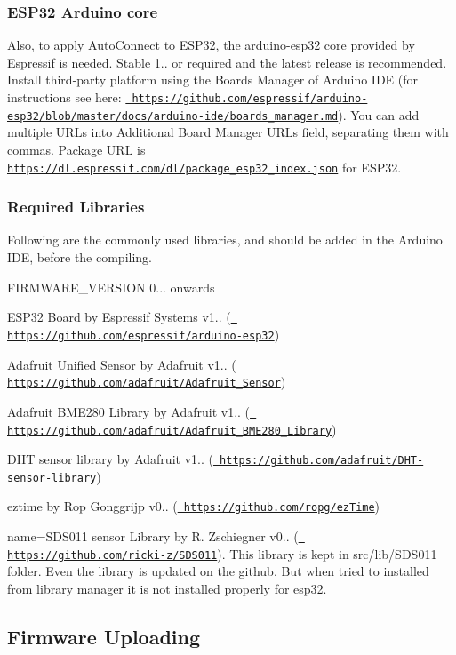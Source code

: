 \hypertarget{index_boardlib}{}\subsubsection{E\+S\+P32 Arduino core}\label{index_boardlib}
Also, to apply Auto\+Connect to E\+S\+P32, the arduino-\/esp32 core provided by Espressif is needed. Stable 1.. or required and the latest release is recommended. Install third-\/party platform using the Boards Manager of Arduino I\+DE (for instructions see here\+: \href{https://github.com/espressif/arduino-esp32/blob/master/docs/arduino-ide/boards_manager.md}{\texttt{ https\+://github.\+com/espressif/arduino-\/esp32/blob/master/docs/arduino-\/ide/boards\+\_\+manager.\+md}}). You can add multiple U\+R\+Ls into Additional Board Manager U\+R\+Ls field, separating them with commas. Package U\+RL is \href{https://dl.espressif.com/dl/package_esp32_index.json}{\texttt{ https\+://dl.\+espressif.\+com/dl/package\+\_\+esp32\+\_\+index.\+json}} for E\+S\+P32.\hypertarget{index_lib}{}\subsubsection{Required Libraries}\label{index_lib}
Following are the commonly used libraries, and should be added in the Arduino I\+DE, before the compiling.
\begin{DoxyEnumerate}
\item F\+I\+R\+M\+W\+A\+R\+E\+\_\+\+V\+E\+R\+S\+I\+ON 0... onwards
\begin{DoxyItemize}
\item E\+S\+P32 Board by Espressif Systems v1.. (\href{https://github.com/espressif/arduino-esp32}{\texttt{ https\+://github.\+com/espressif/arduino-\/esp32}})
\item Adafruit Unified Sensor by Adafruit v1.. (\href{https://github.com/adafruit/Adafruit_Sensor}{\texttt{ https\+://github.\+com/adafruit/\+Adafruit\+\_\+\+Sensor}})
\item Adafruit B\+M\+E280 Library by Adafruit v1.. (\href{https://github.com/adafruit/Adafruit_BME280_Library}{\texttt{ https\+://github.\+com/adafruit/\+Adafruit\+\_\+\+B\+M\+E280\+\_\+\+Library}})
\item D\+HT sensor library by Adafruit v1.. (\href{https://github.com/adafruit/DHT-sensor-library}{\texttt{ https\+://github.\+com/adafruit/\+D\+H\+T-\/sensor-\/library}})
\item eztime by Rop Gonggrijp v0.. (\href{https://github.com/ropg/ezTime}{\texttt{ https\+://github.\+com/ropg/ez\+Time}})
\item name=S\+D\+S011 sensor Library by R. Zschiegner v0.. (\href{https://github.com/ricki-z/SDS011}{\texttt{ https\+://github.\+com/ricki-\/z/\+S\+D\+S011}}). This library is kept in src/lib/\+S\+D\+S011 folder. Even the library is updated on the github. But when tried to installed from library manager it is not installed properly for esp32.
\end{DoxyItemize}
\end{DoxyEnumerate}\hypertarget{index_upload}{}\subsection{Firmware Uploading}\label{index_upload}
